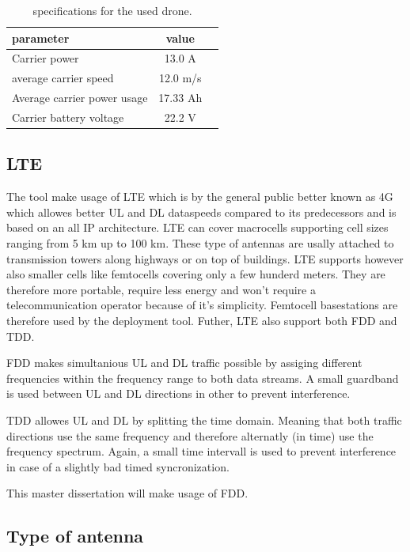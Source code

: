 \begin{table}[h!]
\centering
\begin{tabular}{|l|c|l|}
\hline
 parameter          & value         \\    \hline
 Carrier power      & 13.0 A \\
 average carrier speed           & 12.0 m/s       \\ 
 Average carrier power usage    & 17.33 Ah      \\ 
 Carrier battery voltage        & 22.2 V \\ \hline
\end{tabular}
\caption{specifications for the used drone.}
\label{table:dronespecs}
\end{table}

\subsection{LTE}
The tool make usage of \gls{LTE} which is by the general public better known as 4G which allowes better \gls{UL} and \gls{DL} dataspeeds 
compared to its predecessors and is based on an all IP architecture. LTE can cover macrocells supporting cell sizes ranging from 5 km up to 100 km. 
These type of antennas are usally attached to transmission towers along highways or on top of buildings. LTE supports however also smaller cells like
femtocells covering only a few hunderd meters. They are therefore more portable, require less energy and won't require a telecommunication operator because
of it's simplicity. Femtocell basestations are therefore used by the deployment tool.
Futher, \gls{LTE} also support both \gls{FDD} and \gls{TDD}.

\gls{FDD} makes simultanious \gls{UL} and \gls{DL} traffic possible by assiging different frequencies within the frequency range 
to both data streams. A small guardband is used between \gls{UL} and \gls{DL} directions in other to prevent interference.

\gls{TDD} allowes  \gls{UL} and \gls{DL} by splitting the time domain. Meaning that both traffic directions use the same frequency and therefore
alternatly (in time) use the frequency spectrum. Again, a small time intervall is used to prevent interference in case of a slightly bad timed syncronization.

This master dissertation will make usage of \gls{FDD}.


\subsection{Type of antenna} %

